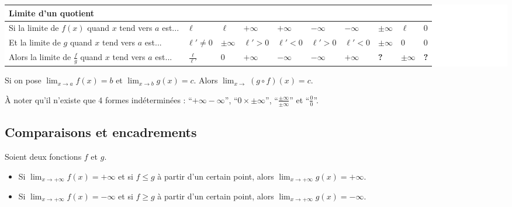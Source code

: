 	\begin{formula}
		\colorbox{white}{%
			\begin{tabularx}{\textwidth}{|X|l|l|l|l|l|l|l|l|l|}
				\hline
				\multicolumn{10}{|l|}{\textbf{Limite d'un quotient}} \\
				\hline
				Si la limite de $f(x)$ quand $x$ tend vers $a$ est... & $\ell$ & $\ell$ & $+\infty$ & $+\infty$ & $-\infty$ & $-\infty$ & $\pm \infty$ & $\ell$ & $0$ \\
				\hline
				Et la limite de $g$ quand $x$ tend vers $a$ est... & $\ell' \neq 0$ & $\pm \infty$ & $\ell' \gt 0$ & $\ell' \lt 0$ & $\ell' \gt 0$ & $\ell' \lt 0$ & $\pm \infty$ & $0$ & $0$ \\
				\hline
				Alors la limite de $\frac{f}{g}$ quand $x$ tend vers $a$ est... & $\displaystyle{\frac{\ell}{\ell'}}$ & $0$ & $+\infty$ & $-\infty$ & $-\infty$ & $+\infty$ & \textbf{?} & $\pm \infty$ & \textbf{?} \\
				\hline
			\end{tabularx}%
		}
	\end{formula}
	
	\begin{formula}
		Si on pose $\lim_{x \rightarrow a} f(x) = b$ et $\lim_{x \rightarrow b} g(x) = c$. Alors $\lim_{x \rightarrow} (g \circ f)(x) = c$.
	\end{formula}
	
	\begin{tip}
		À noter qu'il n'existe que 4 formes indéterminées : ``$+\infty - \infty$'', ``$0 \times \pm \infty$'', ``$\frac{\pm \infty}{\pm \infty}$'' et ``$\frac{0}{0}$''.
	\end{tip}
	
	\subsection{Comparaisons et encadrements}
	
	\begin{formula}
		Soient deux fonctions $f$ et $g$.
		\begin{itemize}
			\item Si $\lim_{x \rightarrow +\infty} f(x) = +\infty$ et si $f \leq g$ à partir d'un certain point,
			\newline
			alors $\lim_{x \rightarrow +\infty} g(x) = +\infty$.
			\item Si $\lim_{x \rightarrow +\infty} f(x) = -\infty$ et si $f \geq g$ à partir d'un certain point,
			\newline
			alors $\lim_{x \rightarrow +\infty} g(x) = -\infty$.
		\end{itemize}
	\end{formula}
	
